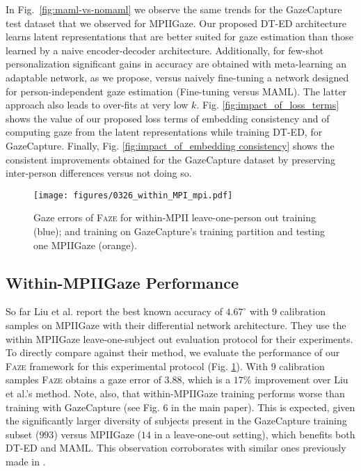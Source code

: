 \documentclass[10pt,twocolumn,letterpaper]{article}
\newcommand{\faze}[0]{\textsc{Faze}\xspace}
\begin{document}
In Fig.~\ref{fig:maml-vs-nomaml} we observe the same trends for the GazeCapture test dataset that we observed for MPIIGaze. Our proposed DT-ED architecture learns latent representations that are better suited for gaze estimation than those learned by a naive encoder-decoder architecture. Additionally, for few-shot personalization significant gains in accuracy are obtained with meta-learning an adaptable network, as we propose, versus naively fine-tuning a network designed for person-independent gaze estimation (Fine-tuning versus MAML). The latter approach also leads to over-fits at very low $k$. Fig. \ref{fig:impact_of_loss_terms} shows the value of our proposed loss terms of embedding consistency and of computing gaze from the latent representations while training DT-ED, for GazeCapture. Finally, Fig. \ref{fig:impact_of_embedding consistency} shows the consistent improvements obtained for the GazeCapture dataset by preserving inter-person differences versus not doing so.

\begin{figure}
    \centering
    \texttt{[image: figures/0326\_within\_MPI\_mpi.pdf]}
    \caption{Gaze errors of \faze for within-MPII leave-one-person out training (blue); and training on GazeCapture's training partition and testing one MPIIGaze (orange).}
    \label{fig:within_mpi}
\end{figure}

\subsection{Within-MPIIGaze Performance}


\noindent
So far Liu et al. \cite{Liu2018BMVC} report the best known accuracy of $4.67^\circ$ with $9$ calibration samples on MPIIGaze with their differential network architecture. They use the within MPIIGaze leave-one-subject out evaluation protocol for their experiments. To directly compare against their method, we evaluate the performance of our \faze framework for this experimental protocol (Fig. \ref{fig:within_mpi}). With $9$ calibration samples \faze obtains a gaze error of $3.88$, which is a $17\%$ improvement over Liu et al.'s method. Note, also, that within-MPIIGaze training performs worse than training with GazeCapture (see Fig. 6 in the main paper). This is expected, given the significantly larger diversity of subjects present in the GazeCapture training subset ($993$) versus MPIIGaze ($14$ in a leave-one-out setting), which benefits both DT-ED and MAML. This observation corroborates with similar ones previously made in \cite{Krafka2016CVPR}.
\end{document}
